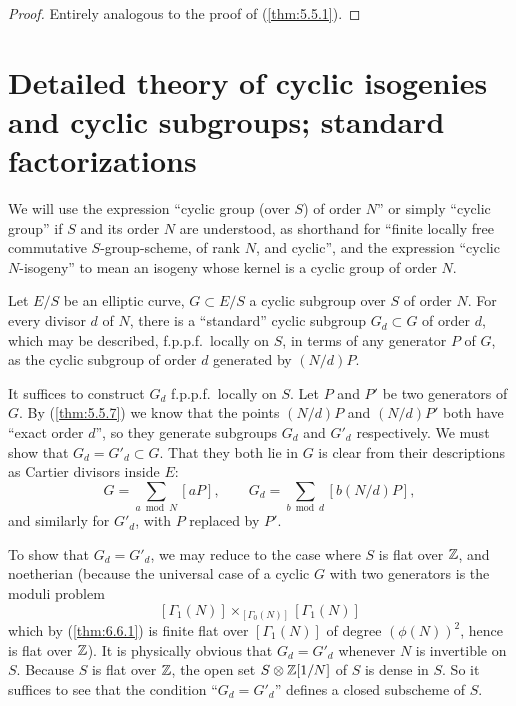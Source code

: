 \begin{proof}
Entirely analogous to the proof of (\ref{thm:5.5.1}).
\end{proof}

\section{Detailed theory of cyclic isogenies and cyclic subgroups; standard factorizations}
\label{sec:6.7}

\begin{pitem}\label{km:6.7.1}
We will use the expression ``cyclic group (over $S$) of order $N$'' or simply ``cyclic group'' if $S$ and its order $N$ are understood, as shorthand for ``finite locally free commutative $S$-group-scheme, of rank $N$, and cyclic'', and the expression ``cyclic $N$-isogeny'' to mean an isogeny whose kernel is a cyclic group of order $N$.
\end{pitem}

\begin{kthm}\label{thm:6.7.2}
Let $E/S$ be an elliptic curve, $G \subset E/S$ a cyclic subgroup over $S$ of order $N$. For every divisor $d$ of $N$, there is a ``standard'' cyclic subgroup $G_d \subset G$ of order $d$, which may be described, f.p.p.f.\ locally on $S$, in terms of any generator $P$ of $G$, as the cyclic subgroup of order $d$ generated by $(N/d)P$.
\end{kthm}

\begin{proof*}
It suffices to construct $G_d$ f.p.p.f.\ locally on $S$. Let $P$ and $P'$ be two generators of $G$. By (\ref{thm:5.5.7}) we know that the points $(N/d)P$ and $(N/d)P'$ both have ``exact order $d$'', so they generate subgroups $G_d$ and $G'_d$ respectively. We must show that $G_d = G'_d \subset G$. That they both lie in $G$ is clear from their descriptions as Cartier divisors inside $E$:
\[
G = \sum_{a \bmod N} [aP], \qquad G_d = \sum_{b \bmod d} [b(N/d)P],
\]
and similarly for $G'_d$, with $P$ replaced by $P'$.

To show that $G_d = G'_d$, we may reduce to the case where $S$ is flat over $\mathbb{Z}$, and noetherian (because the universal case of a cyclic $G$ with two generators is the moduli problem
\[
[\Gamma_1(N)] \times_{[\Gamma_0(N)]} [\Gamma_1(N)]
\]
which by (\ref{thm:6.6.1}) is finite flat over $[\Gamma_1(N)]$ of degree $(\phi(N))^2$, hence is flat over $\mathbb{Z}$). It is physically obvious that $G_d = G'_d$ whenever $N$ is invertible on $S$. Because $S$ is flat over $\mathbb{Z}$, the open set $S \otimes \mathbb{Z}[1/N]$ of $S$ is dense in $S$. So it suffices to see that the condition ``$G_d = G'_d$'' defines a closed subscheme of $S$.
\end{proof*}

